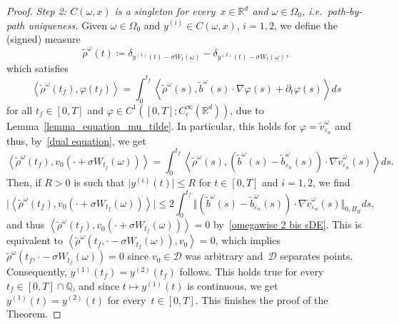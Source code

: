 \documentclass[a4paper,10pt]{article}
\newcommand\1{\mathbbm{1}}
\newcommand{\mr}{\mathbb{R}}
\newcommand{\eps}{\varepsilon}
\numberwithin{equation}{section}
\begin{document}
\begin{proof}
\emph{Step 2: $C(\omega,x) $ is a singleton for every~$x \in \mr^d$ and $\omega \in \Omega_0$, i.e.~path-by-path uniqueness.} Given $\omega\in \Omega_0$ and $y^{(i)}\in C(\omega,x)$, $i=1,2$, we define the (signed) measure
\begin{equation*}
\widetilde{\rho}^\omega(t)  \coloneqq \delta_{y^{(1)}(t) - \sigma W_t(\omega)}  - \delta_{y^{(2)}(t) - \sigma W_t(\omega)},
\end{equation*}
which satisfies
\begin{equation*}
\left\langle \widetilde{\rho}^\omega(t_{f})  ,\varphi(
t_{f})  \right\rangle =\int_{0}^{t_{f}}\left\langle \widetilde{\rho
}^\omega(s)  ,\widetilde{b}^\omega(s)
\cdot\nabla\varphi(s)  + \partial_t \varphi(s) \right\rangle ds
\end{equation*}
for all $t_{f}\in [0,T]$ and $\varphi\in C^{1}([0,T];C_{c}^{\infty}(\mathbb{R}^{d}))$, due to Lemma~\ref{lemma_equation_mu_tilde}. In particular, this holds for $\varphi=\widetilde{v}_{\eps_{n}}^\omega $ and thus, by~\eqref{dual equation}, we get 
\begin{equation*}
\left\langle \widetilde{\rho}^\omega(t_{f})  ,v_{0} (\cdot+\sigma W_{t_{f}}(\omega))  \right\rangle =\int_{0}^{t_{f}}\left\langle \widetilde{\rho}^\omega(s) ,(
\widetilde{b}^\omega(s)  -\widetilde{b}_{\eps_{n}}^\omega(s) )  \cdot\nabla\widetilde{v}_{\eps_{n}}^\omega(s)  \right\rangle ds .
\end{equation*}
Then, if $R>0$ is such that $\vert y^{(i)}(t)\vert \leq R$ for $t\in [0,T]$ and $i=1,2$, we find
\begin{equation*}
\big\vert \left\langle \widetilde{\rho}^\omega(t_{f})
,v_{0} (\cdot+\sigma W_{t_{f}}(\omega))
\right\rangle \big\vert \leq2\int_{0}^{t_{f}} \big\Vert (
\widetilde{b}^\omega(s)  -\widetilde{b}_{\eps_{n}}^\omega(s) )  \cdot\nabla\widetilde{v}_{\eps_{n}}^\omega(s) \big\Vert _{0,B_R}ds ,
\end{equation*}
and thus $\left\langle \widetilde{\rho}^\omega(t_{f}),v_{0}(\cdot+\sigma W_{t_{f}}(  \omega)  )\right\rangle =0$ by~\eqref{omegawise 2 bis sDE}. This is equivalent to
$\left\langle \widetilde{\rho}^\omega (t_{f},\cdot-\sigma W_{t_{f}}(\omega))  ,v_{0}\right\rangle =0$, which implies
$\widetilde{\rho}^\omega(t_{f},\cdot-\sigma W_{t_{f}}(\omega))  =0$ since $v_0 \in \mathcal{D}$ was arbitrary and~$\mathcal{D}$ separates points. Consequently, $y^{(1)}(t_{f})  =y^{(2)}(t_{f})$ follows. This holds true for every $t_{f}\in [0,T] \cap\mathbb{Q}$, and since $t\mapsto y^{(1)}(t)$ is continuous, we get $y^{(1)}(t) =y^{(2)}(t)$ for every~$t \in [0,T]$. This finishes the proof of the Theorem.
\end{proof}
\end{document}

